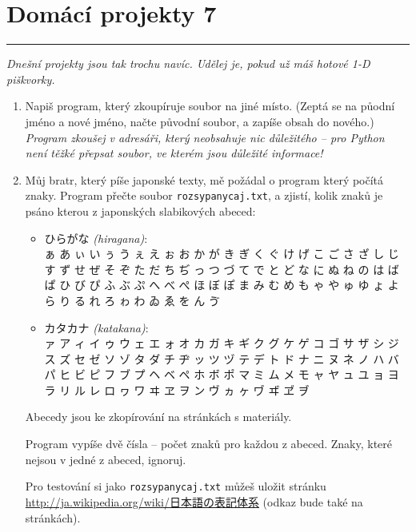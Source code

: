 \documentclass[a4paper,10pt]{article}
\newcommand\plsetno{7}
\newcommand\startsection[1]{
     \vspace{0.2ex}
    \hrule
    {\fontspec{Oxygen} \tiny
     \vspace{-1ex}
     \emph{#1}
     \vspace{-1.5em}
    }
}
\begin{document}
\section*{Domácí projekty \plsetno}

\startsection{Dnešní projekty jsou tak trochu navíc. Udělej je, pokud už máš hotové 1-D piškvorky.}

\begin{enumerate}[resume]

\item
    Napiš program, který zkoupíruje soubor na jiné místo.
    (Zeptá se na půodní jméno a nové jméno, načte původní soubor,
    a zapíše obsah do nového.)
    \\\emph{\small Program zkoušej v adresáři, který neobsahuje nic
        důležitého – pro Python není těžké přepsat soubor,
        ve kterém jsou důležité informace!}

\item
    Můj bratr, který píše japonské texty, mě požádal o program
    který počítá znaky.
    Program přečte soubor \verb+rozsypanycaj.txt+, a zjistí,
    kolik znaků je psáno kterou z japonských slabikových abeced:
    \begin{itemize}
    \item { ひらがな \emph{(hiragana)}:
        \\ ぁ あ ぃ い ぅ う ぇ え ぉ お か が き ぎ く
        ぐ け げ こ ご さ ざ し じ す ず せ ぜ そ ぞ た
        だ ち ぢ っ つ づ て で と ど な に ぬ ね の は
        ば ぱ ひ び ぴ ふ ぶ ぷ へ べ ぺ ほ ぼ ぽ ま み
        む め も ゃ や ゅ ゆ ょ よ ら り る れ ろ ゎ わ
        ゐ ゑ を ん ゔ}
    \item { カタカナ \emph{(katakana)}:
        \\ ァ ア ィ イ ゥ ウ ェ エ ォ オ カ ガ キ ギ ク
        グ ケ ゲ コ ゴ サ ザ シ ジ ス ズ セ ゼ ソ ゾ タ
        ダ チ ヂ ッ ツ ヅ テ デ ト ド ナ ニ ヌ ネ ノ ハ
        バ パ ヒ ビ ピ フ ブ プ ヘ ベ ペ ホ ボ ポ マ ミ
        ム メ モ ャ ヤ ュ ユ ョ ヨ ラ リ ル レ ロ ヮ ワ
        ヰ ヱ ヲ ン ヴ ヵ ヶ ヷ ヸ ヹ ヺ}
    \end{itemize}
    Abecedy jsou ke zkopírování na stránkách s materiály.

    Program vypíše dvě čísla – počet znaků pro každou z abeced.
    Znaky, které nejsou v jedné z abeced, ignoruj.

    Pro testování si jako \verb+rozsypanycaj.txt+ můžeš uložit stránku
    \href{http://ja.wikipedia.org/wiki/%E6%97%A5%E6%9C%AC%E8%AA%9E%E3%81%AE%E8%A1%A8%E8%A8%98%E4%BD%93%E7%B3%BB}{
        http://ja.wikipedia.org/wiki/{日本語の表記体系}}
    (odkaz bude také na stránkách).

\end{enumerate}
\end{document}
